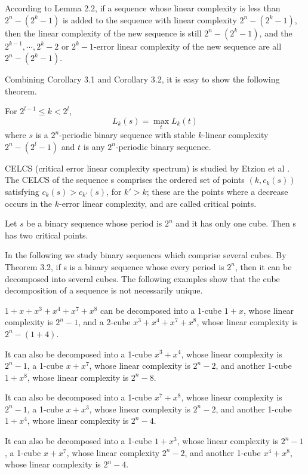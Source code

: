 \documentclass[10pt,conference,twocolumn]{IEEEtran}
\begin{document}
According to Lemma 2.2, if a sequence whose linear complexity is
less than $2^n-(2^k-1)$ is added to the sequence with linear
complexity $2^n-(2^k-1)$, then the linear complexity of the new
sequence is still $2^n-(2^k-1)$, and the $2^{k-1},\cdots, 2^k-2$ or
$2^k-1$-error linear complexity of the new sequence are all
$2^n-(2^k-1)$.

Combining Corollary   3.1 and Corollary   3.2, it is easy to show
the following theorem.


 For $ 2^{l-1}\le k<2^{l}$,
$$L_k(s)=\max\limits_tL_k(t)$$ where $s$ is a $2^n$-periodic  binary sequence
with stable $k$-linear complexity $2^n-(2^l-1)$ and $t$ is any
$2^n$-periodic  binary sequence.



CELCS (critical error linear complexity spectrum) is studied  by
Etzion et al \cite{Etzion}. The CELCS of the sequence s comprises
the ordered set of points $(k,c_k(s))$ satisfying $c_k(s)>
c_{k'}(s)$, for $k'>k$; these are the points where a decrease occurs
in the $k$-error linear complexity, and are called critical points.

Let $s$ be a binary sequence whose period is $2^n$ and it has only
one cube. Then s has two critical points.

In the following we study binary sequences which comprise several
cubes. By Theorem 3.2, if s is a binary sequence whose every period
is $2^n$, then it can be decomposed into several cubes. The
following examples show that the cube decomposition of a sequence is
not necessarily unique.

 $1+x+x^3+x^4+x^7+x^8$ can be decomposed into a 1-cube $1+x$, whose linear complexity is $2^n -1$,
  and a 2-cube  $x^3+x^4+x^7+x^8$, whose linear complexity is $2^n -(1+4)$.

It can also be decomposed into a 1-cube $x^3+x^4$, whose linear
complexity is $2^n -1$, a 1-cube $x+x^7$, whose linear complexity is
$2^n -2$, and another 1-cube $1+x^8$, whose linear complexity is
$2^n -8$.

It can also be decomposed into a 1-cube $x^7+x^8$, whose linear
complexity is $2^n -1$, a 1-cube $x+x^3$, whose linear complexity is
$2^n -2$, and another 1-cube $1+x^4$, whose linear complexity is
$2^n -4$.

It can also be decomposed into a 1-cube $1+x^3$, whose linear
complexity is $2^n -1$, a 1-cube $x+x^7$, whose linear complexity
$2^n -2$, and another 1-cube $x^4+x^8$, whose linear complexity is
$2^n -4$.
\end{document}
